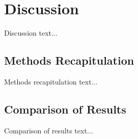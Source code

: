 \chapter{Discussion} \label{chap:discussion}
Discussion text...

\section{Methods Recapitulation} \label{sec:methods_recapitulation}
Methods recapitulation text...

\section{Comparison of Results} \label{sec:comparison_of_results}
Comparison of results text...
